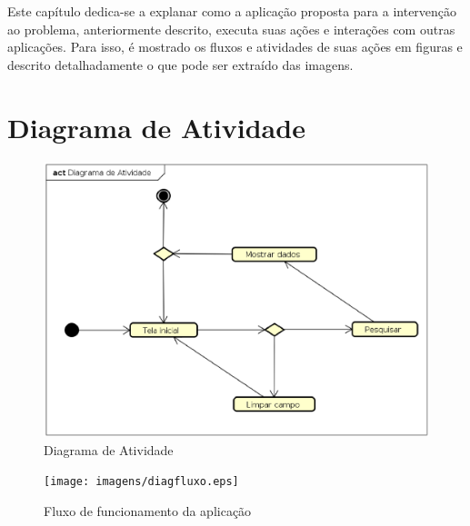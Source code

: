 Este capítulo dedica-se a explanar como a aplicação proposta para a intervenção ao problema, anteriormente descrito, executa suas ações e interações com outras aplicações. Para isso, é mostrado os fluxos e atividades de suas ações em figuras e descrito detalhadamente o que pode ser extraído das imagens.

\section{Diagrama de Atividade}

\begin{figure}[!htb]
        \caption{\label{diagrama1}Diagrama de Atividade}
        \begin{center}
                \includegraphics[width=\textwidth]{imagens/diagact.eps}
        \end{center}
\end{figure}


\begin{figure}[!htb]
        \caption{\label{diagrama1}Fluxo de funcionamento da aplicação}
        \begin{center}
                \texttt{[image: imagens/diagfluxo.eps]}
        \end{center}
\end{figure}
